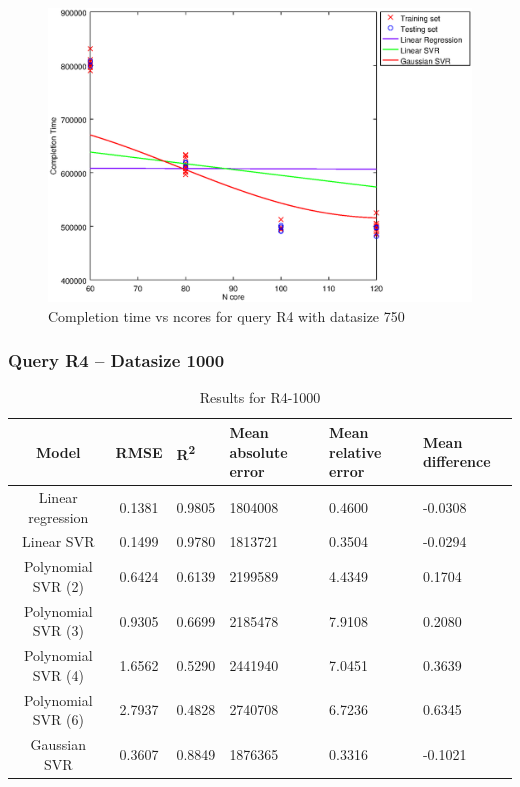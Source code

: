 \documentclass[a4paper,11pt]{article}
\begin{document}
\begin {figure}[hbtp]
\centering
\includegraphics[width=\textwidth]{output/R4_750_LINEAR_NCORE/plot_R4_750_bestmodels.eps}
\caption{Completion time vs ncores for query R4 with datasize 750}
\label{fig:all_linear_R4_750}
\end {figure}

\newpage
\subsubsection{Query R4 -- Datasize 1000}
\begin{table}[H]
	\centering
	\begin{adjustbox}{center}
		\begin{tabular}{c | c M{1.2cm} M{2.5cm} M{2.5cm} M{1.8cm}}
			Model & RMSE & R\textsuperscript{2} & Mean absolute error & Mean relative error & Mean difference \tabularnewline
			\hline
			Linear regression & 0.1381 & 0.9805 & 1804008 & 0.4600 & -0.0308 \\
			Linear SVR & 0.1499 & 0.9780 & 1813721 & 0.3504 & -0.0294 \\
			Polynomial SVR (2) & 0.6424 & 0.6139 & 2199589 & 4.4349 & 0.1704 \\
			Polynomial SVR (3) & 0.9305 & 0.6699 & 2185478 & 7.9108 & 0.2080 \\
			Polynomial SVR (4) & 1.6562 & 0.5290 & 2441940 & 7.0451 & 0.3639 \\
			Polynomial SVR (6) & 2.7937 & 0.4828 & 2740708 & 6.7236 & 0.6345 \\
			Gaussian SVR & 0.3607 & 0.8849 & 1876365 & 0.3316 & -0.1021 \\
		\end{tabular}
	\end{adjustbox}
	\\
	\caption{Results for R4-1000}
	\label{fig:all_linear_R4_1000}
\end{table}
\end{document}
